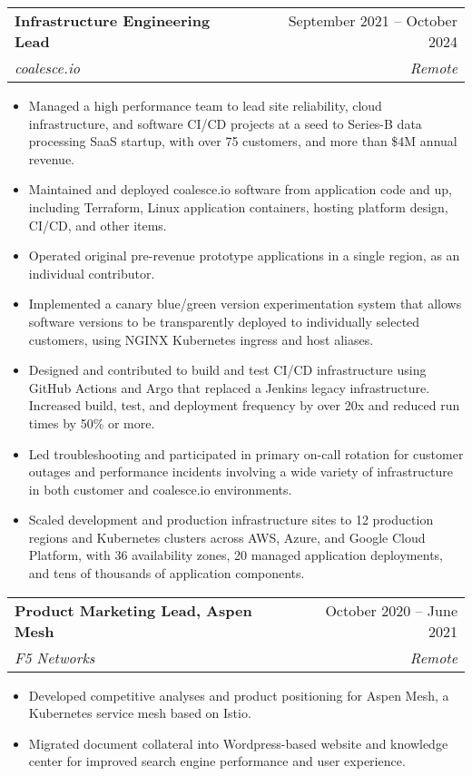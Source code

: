 \documentclass[letterpaper,11pt]{article}
\makeatletter
\newcommand{\resumeItem}[1]{
  \item\footnotesize{
    {#1 \vspace{-2pt}}
  }
}
\newcommand{\resumeSubheading}[4]{
  \vspace{-2pt}\item
    \begin{tabular*}{0.97\textwidth}[t]{l@{\extracolsep{\fill}}r}
      \textbf{\small#1} & \small#2 \\
      \textit{\small#3} & \textit{\small #4} \\
    \end{tabular*}\vspace{-7pt}
}
\newcommand{\resumeSubSubheading}[2]{
    \item
    \begin{tabular*}{0.97\textwidth}{l@{\extracolsep{\fill}}r}
      \textit{\small#1} & \textit{\small #2} \\
    \end{tabular*}\vspace{-7pt}
}
\newcommand{\resumeSubHeadingListEnd}{\end{itemize}}
\newcommand{\resumeItemListStart}{\begin{itemize}}
\newcommand{\resumeItemListEnd}{\end{itemize}\vspace{-5pt}}
\makeatother
\begin{document}
    \resumeSubheading
      {Infrastructure Engineering Lead}{September 2021 -- October 2024}
      {coalesce.io}{Remote}
      \resumeItemListStart
        \resumeItem{Managed a high performance team to lead site reliability, cloud infrastructure, and software CI/CD projects at a seed to Series-B data processing SaaS startup, with over 75 customers, and more than \$4M annual revenue.}
        \resumeItem{Maintained and deployed coalesce.io software from application code and up, including Terraform, Linux application containers, hosting platform design, CI/CD, and other items.}
        \resumeItem{Operated original pre-revenue prototype applications in a single region, as an individual contributor.}
        \resumeItem{Implemented a canary blue/green version experimentation system that allows software versions to be transparently deployed to individually selected customers, using NGINX Kubernetes ingress and host aliases.}
        \resumeItem{Designed and contributed to build and test CI/CD infrastructure using GitHub Actions and Argo that replaced a Jenkins legacy infrastructure. Increased build, test, and deployment frequency by over 20x and reduced run times by 50\% or more.}
        \resumeItem{Led troubleshooting and participated in primary on-call rotation for customer outages and performance incidents involving a wide variety of infrastructure in both customer and coalesce.io environments.}
        \resumeItem{Scaled development and production infrastructure sites to 12 production regions and Kubernetes clusters across AWS, Azure, and Google Cloud Platform, with 36 availability zones, 20 managed application deployments, and tens of thousands of application components.}
      \resumeItemListEnd
      

    \resumeSubheading
      {Product Marketing Lead, Aspen Mesh}{October 2020 -- June 2021}
      {F5 Networks}{Remote}
      \resumeItemListStart
        \resumeItem{Developed competitive analyses and product positioning for Aspen Mesh, a Kubernetes service mesh based on Istio.}
        \resumeItem{Migrated document collateral into Wordpress-based website and knowledge center for improved search engine performance and user experience.}
      \resumeItemListEnd
\end{document}
